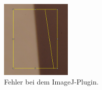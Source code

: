 \begin{figure}[ht]
	\centering
	\includegraphics[width=0.30\textwidth]{bilder/MTF-Fehler.PNG}
	\caption{Fehler bei dem ImageJ-Plugin.}
	\label{fig:fail}	
\end{figure}